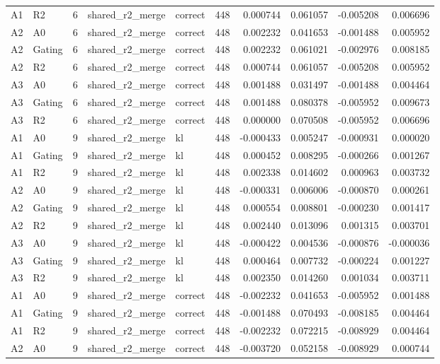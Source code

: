 \begin{tabular}{llrllrrrrr}
A1 & R2 & 6 & shared_r2_merge & correct & 448 & 0.000744 & 0.061057 & -0.005208 & 0.006696 \\
A2 & A0 & 6 & shared_r2_merge & correct & 448 & 0.002232 & 0.041653 & -0.001488 & 0.005952 \\
A2 & Gating & 6 & shared_r2_merge & correct & 448 & 0.002232 & 0.061021 & -0.002976 & 0.008185 \\
A2 & R2 & 6 & shared_r2_merge & correct & 448 & 0.000744 & 0.061057 & -0.005208 & 0.005952 \\
A3 & A0 & 6 & shared_r2_merge & correct & 448 & 0.001488 & 0.031497 & -0.001488 & 0.004464 \\
A3 & Gating & 6 & shared_r2_merge & correct & 448 & 0.001488 & 0.080378 & -0.005952 & 0.009673 \\
A3 & R2 & 6 & shared_r2_merge & correct & 448 & 0.000000 & 0.070508 & -0.005952 & 0.006696 \\
A1 & A0 & 9 & shared_r2_merge & kl & 448 & -0.000433 & 0.005247 & -0.000931 & 0.000020 \\
A1 & Gating & 9 & shared_r2_merge & kl & 448 & 0.000452 & 0.008295 & -0.000266 & 0.001267 \\
A1 & R2 & 9 & shared_r2_merge & kl & 448 & 0.002338 & 0.014602 & 0.000963 & 0.003732 \\
A2 & A0 & 9 & shared_r2_merge & kl & 448 & -0.000331 & 0.006006 & -0.000870 & 0.000261 \\
A2 & Gating & 9 & shared_r2_merge & kl & 448 & 0.000554 & 0.008801 & -0.000230 & 0.001417 \\
A2 & R2 & 9 & shared_r2_merge & kl & 448 & 0.002440 & 0.013096 & 0.001315 & 0.003701 \\
A3 & A0 & 9 & shared_r2_merge & kl & 448 & -0.000422 & 0.004536 & -0.000876 & -0.000036 \\
A3 & Gating & 9 & shared_r2_merge & kl & 448 & 0.000464 & 0.007732 & -0.000224 & 0.001227 \\
A3 & R2 & 9 & shared_r2_merge & kl & 448 & 0.002350 & 0.014260 & 0.001034 & 0.003711 \\
A1 & A0 & 9 & shared_r2_merge & correct & 448 & -0.002232 & 0.041653 & -0.005952 & 0.001488 \\
A1 & Gating & 9 & shared_r2_merge & correct & 448 & -0.001488 & 0.070493 & -0.008185 & 0.004464 \\
A1 & R2 & 9 & shared_r2_merge & correct & 448 & -0.002232 & 0.072215 & -0.008929 & 0.004464 \\
A2 & A0 & 9 & shared_r2_merge & correct & 448 & -0.003720 & 0.052158 & -0.008929 & 0.000744 \\

\end{tabular}
